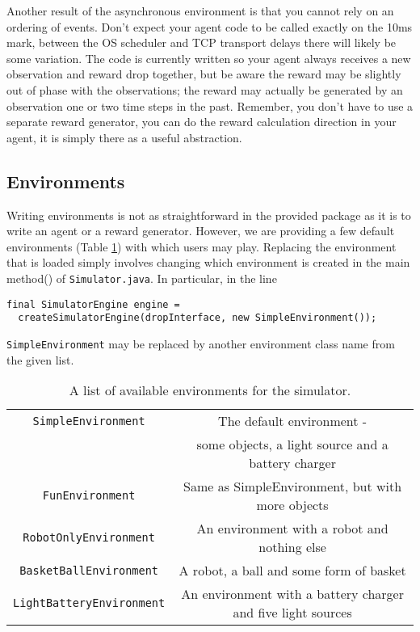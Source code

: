 \documentclass[12pt]{article}
\newcommand{\code}[1]{\texttt{#1}}
\begin{document}
Another result of the asynchronous environment is that you cannot rely on an ordering of events.  Don't expect your agent code to be called exactly on the 10ms mark, between the OS scheduler and TCP transport delays there will likely be some variation.  The code is currently written so your agent always receives a new observation and reward drop together, but be aware the reward may be slightly out of phase with the observations; the reward may actually be generated by an observation one or two time steps in the past.  Remember, you don't have to use a separate reward generator, you can do the reward calculation direction in your agent, it is simply there as a useful abstraction.

\subsection{Environments}

Writing environments is not as straightforward in the provided package as it
is to write an agent or a reward generator. However, we are providing a few
default environments (Table \ref{table:environment_list}) with which users may 
play. Replacing the environment that is loaded simply involves changing 
which environment is created in the main method() of \verb+Simulator.java+.
In particular, in the line

\begin{verbatim}
final SimulatorEngine engine = 
  createSimulatorEngine(dropInterface, new SimpleEnvironment());
\end{verbatim}

\verb+SimpleEnvironment+ may be replaced by another environment class name
from the given list.

\begin{table}
\small{
\begin{tabular}{|c|c|}
\hline
\code{SimpleEnvironment} & The default environment - \\
& some objects, a light source and a battery charger \\
\hline
\code{FunEnvironment} & Same as SimpleEnvironment, but with more objects \\
\hline
\code{RobotOnlyEnvironment} & An environment with a robot and nothing else \\
\hline
\code{BasketBallEnvironment} & A robot, a ball and some form of basket \\
\hline
\code{LightBatteryEnvironment} & An environment with a battery charger and five light sources \\ 
\hline
\end{tabular}
}
\caption{A list of available environments for the simulator.\label{table:environment_list}}
\end{table}
\end{document}
